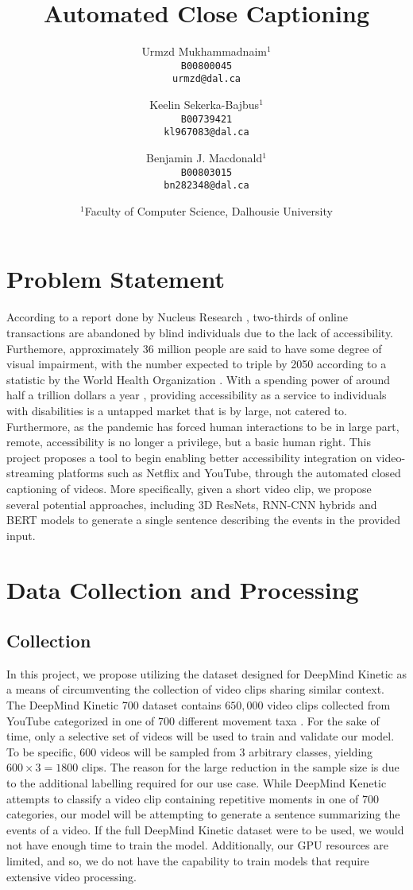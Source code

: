 \documentclass[10pt]{article}
\title{Automated Close Captioning}
\author{
Urmzd Mukhammadnaim$^1$\\
\texttt{B00800045} \\
\texttt{urmzd@dal.ca} \\
\and
Keelin Sekerka-Bajbus$^1$\\
\texttt{B00739421}\\
\texttt{kl967083@dal.ca}
\fig
\and
Benjamin J. Macdonald$^1$\\
\texttt{B00803015}\\
\texttt{bn282348@dal.ca}
}
\date{$^1$Faculty of Computer Science, Dalhousie University}
\begin{document}
\section{Problem Statement}
According to a report done by Nucleus Research \cite{nucleus_research_2019}, two-thirds
of online transactions are abandoned by blind individuals due to the lack of accessibility.
Furthemore, approximately 36 million people are said to have some degree of visual impairment, with the number
expected to triple by 2050 according to a statistic by the World Health Organization \cite{world_health_organization_2021}.
With a spending power of around half a trillion dollars a year \cite{yin_smith_overton_shaewitz_2018}, providing accessibility
as a service to individuals with disabilities is a untapped market that is by large, not catered to.
Furthermore, as the pandemic has forced human interactions to be in large part, remote, accessibility is no longer
a privilege, but a basic human right. This project proposes a tool to begin enabling better accessibility
integration on video-streaming platforms such as Netflix and YouTube, through the automated
closed captioning of videos. More specifically, given a short video clip, we propose several potential approaches,
including 3D ResNets, RNN-CNN hybrids and BERT models to generate a single sentence describing the events in the provided input.

\section{Data Collection and Processing}

\subsection{Collection}
In this project, we propose utilizing the dataset designed for DeepMind Kinetic as a means of
circumventing the collection of video clips sharing similar context. 
The DeepMind Kinetic 700 dataset contains $650,000$ video clips collected from YouTube
categorized in one of 700 different movement taxa \cite{DBLP:journals/corr/abs-2010-10864}. 
For the sake of time, only a selective set of videos will be used to train and validate
our model. To be specific, $600$ videos will be sampled from $3$ arbitrary classes, yielding 
$600 \times 3 = 1800$ clips. The reason for the large reduction in the sample size is due to the additional labelling
required for our use case. While DeepMind Kenetic attempts to classify a video clip containing repetitive moments
in one of 700 categories, our model will be attempting to generate a sentence summarizing the events of a video.
If the full DeepMind Kinetic dataset were to be used, we would not have enough time to train the model.
Additionally, our GPU resources are limited, and so, we do not have the capability to train models
that require extensive video processing.
\end{document}
